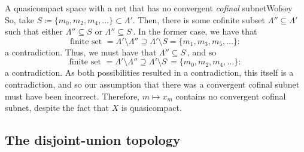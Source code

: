 \begin{exm}{A quasicompact space with a net that has no convergent \emph{cofinal} subnet}{Wofsey}
So, take $S\coloneqq \{ m_0,m_2,m_4,\ldots \} \subset \Lambda '$.  Then, there is some cofinite subset $\Lambda ''\subseteq \Lambda '$ such that either $\Lambda ''\subseteq S$ or $\Lambda ''\subseteq S^{\comp}$.  In the former case, we have that
\begin{equation*}
\text{finite set }=\Lambda '\setminus \Lambda '' \supseteq \Lambda '\setminus S=\{ m_1,m_3,m_5,\ldots \} :
\end{equation*}
a contradiction.  Thus, we must have that $\Lambda ''\subseteq S^{\comp}$, and so
\begin{equation*}
\text{finite set }=\Lambda '\setminus \Lambda ''\supseteq \Lambda '\setminus S^{\comp}=\{ m_0,m_2,m_4,\ldots \} :
\end{equation*}
a contradiction.  As both possibilities resulted in a contradiction, this itself is a contradiction, and so our assumption that there was a convergent cofinal subnet must have been incorrect.  Therefore, $m\mapsto x_m$ contains no convergent cofinal subnet, despite the fact that $X$ is quasicompact.
\end{exm}

\subsection{The disjoint-union topology}

